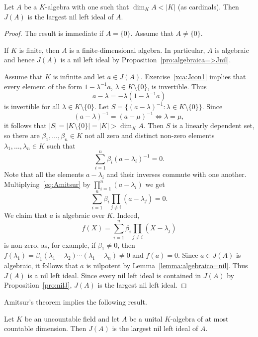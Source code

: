 \begin{theorem}[Amitsur]
	\label{thm:Amitsur}
	Let $A$ be a $K$-algebra with one such that $\dim_KA<|K|$ (as cardinals). Then 
	$J(A)$ is the largest nil left ideal of $A$. 
\end{theorem}

\begin{proof}
    The result is immediate if $A=\{0\}$. Assume that $A\ne\{0\}$.

    If $K$ is finite, then $A$ is a finite-dimensional algebra. In particular, $A$ is algebraic and
	hence $J(A)$ is a nil left ideal by Proposition~\ref{pro:algebraica=>Jnil}.

	Assume that $K$ is infinite and let $a\in J(A)$. Exercise~\ref{xca:Jcon1} implies that 
	every element of the form 
	$1-\lambda^{-1}a$, $\lambda\in K\setminus\{0\}$, is invertible. Thus  
	\[
		a-\lambda=-\lambda(1-\lambda^{-1}a)
	\]
  is invertible for all $\lambda\in K\setminus\{0\}$.  Let
	$S=\{(a-\lambda)^{-1}:\lambda\in K\setminus\{0\}\}$. Since 
	\[
	(a-\lambda)^{-1}=(a-\mu)^{-1}\Longleftrightarrow\lambda=\mu,
	\]
	it follows that $|S|=|K\setminus\{0\}|=|K|>\dim_KA$. Then $S$  
	is a linearly dependent set, so there are $\beta_1,\dots,\beta_n\in K$
	not all zero and distinct non-zero elements $\lambda_1,\dots,\lambda_n\in K$ such that 
	\begin{equation}
		\label{eq:Amitsur}
		\sum_{i=1}^n \beta_i(a-\lambda_i)^{-1}=0.
	\end{equation}
   Note that all the
  elements $a-\lambda_i$ and their inverses commute with one another. 
	Multiplying~\eqref{eq:Amitsur} by $\prod_{i=1}^n(a-\lambda_i)$ we get 
	\[
		\sum_{i=1}^n\beta_i\prod_{j\ne i}(a-\lambda_j)=0.
	\]
	We claim that $a$ is algebraic over $K$. Indeed,  
	\[
		f(X)=\sum_{i=1}^n\beta_i\prod_{j\ne i}(X-\lambda_j)
	\]
	is non-zero, as, for example, if $\beta_1\ne0$, then  
	$f(\lambda_1)=\beta_1(\lambda_1-\lambda_2)\cdots(\lambda_1-\lambda_n)\ne0$
	and $f(a)=0$. Since $a\in J(A)$ is algebraic, it follows that 
	$a$ is nilpotent by Lemma~\ref{lemma:algebraico=nil}. 
  Thus $J(A)$ is a nil left ideal. Since every nil left ideal is contained in $J(A)$ by
  Proposition~\ref{pro:nilJ}, $J(A)$ is the largest nil left ideal.
\end{proof}

Amitsur's theorem implies the following result. 

\begin{corollary}
Let $K$ be an uncountable field and let $A$ be a unital
$K$-algebra of at most countable dimension. Then $J(A)$
is the largest nil left ideal of $A$.
\end{corollary}

